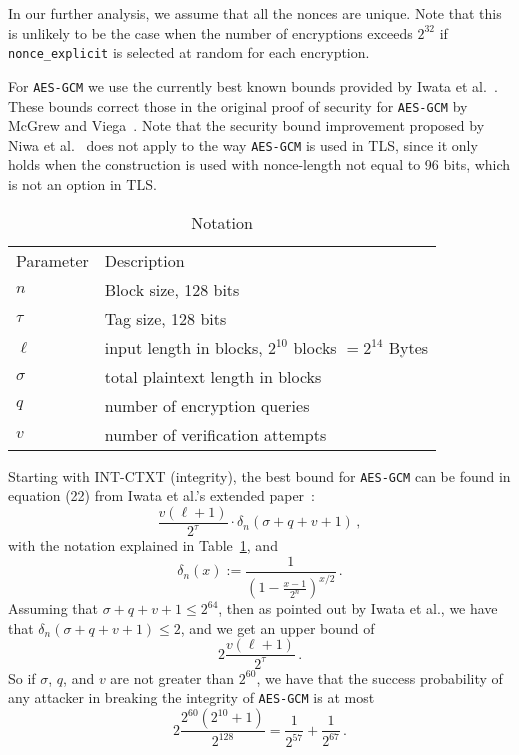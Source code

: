 \documentclass{article}
\newcommand{\defeq}{:=}
\begin{document}
In our further analysis, we assume that all the nonces are unique. Note that this is unlikely to be the case when the number of encryptions exceeds $2^{32}$ if \verb|nonce_explicit| is selected at random for each encryption.

For \texttt{AES-GCM} we use the currently best known bounds provided by Iwata et al.~\cite{GCMLNCS,DBLP:journals/iacr/IwataOM12}. These bounds correct those in the original proof of security for \texttt{AES-GCM} by McGrew and Viega~\cite{DBLP:conf/indocrypt/McGrewV04,DBLP:journals/iacr/McGrewV04}. Note that the security bound improvement proposed by Niwa et al.~\cite{DBLP:conf/fse/NiwaOMI15,DBLP:journals/iacr/NiwaOMI15} does not apply to the way \texttt{AES-GCM} is used in TLS, since it only holds when the construction is used with nonce-length not equal to 96 bits, which is not an option in TLS. 

\begin{table}[H]
  \centering
  \caption{Notation}\label{table:notation}
  \begin{tabular}{ll}
    \toprule
    Parameter & Description\\
    \cmidrule{1-2}
    $n$ & Block size, 128 bits\\
    $\tau$ & Tag size, 128 bits\\
    $\ell$ & input length in blocks, $2^{10}$ blocks $ = 2^{14}$ Bytes\\
    $\sigma$ & total plaintext length in blocks\\
    $q$ & number of encryption queries\\
    $v$ & number of verification attempts\\
    \bottomrule
  \end{tabular}
\end{table}

Starting with INT-CTXT (integrity), the best bound for \texttt{AES-GCM} can be found in equation (22) from Iwata et al.'s extended paper~\cite{DBLP:journals/iacr/IwataOM12}:
\begin{equation}
  \frac{v(\ell+1)}{2^\tau}\cdot\delta_n(\sigma+q+v+1)\,,
\end{equation}
with the notation explained in Table~\ref{table:notation}, and
\begin{equation}
  \delta_n(x) \defeq \frac{1}{\left(1 - \frac{x-1}{2^n}\right)^{x/2}}\,.
\end{equation}
Assuming that $\sigma+q+v+1\le 2^{64}$, then as pointed out by Iwata et al., we have that $\delta_n(\sigma+q+v+1) \le 2$, and we get an upper bound of
\begin{equation}
  2\frac{v(\ell+1)}{2^\tau}\,.
\end{equation}
So if $\sigma$, $q$, and $v$ are not greater than $2^{60}$, we have that the success probability of any attacker in breaking the integrity of \texttt{AES-GCM} is at most
\begin{equation}
  2\frac{2^{60}(2^{10}+1)}{2^{128}} = \frac{1}{2^{57}} + \frac{1}{2^{67}}\,.
\end{equation}
\end{document}

